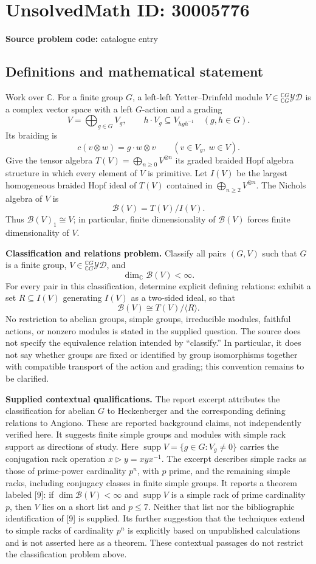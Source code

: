 \documentclass[11pt]{article}
\newcommand{\C}{\mathbb{C}}
\begin{document}
\section*{UnsolvedMath ID: 30005776}
\textbf{Source problem code:} catalogue entry
\subsection{Definitions and mathematical statement}
Work over \(\C\). For a finite group \(G\), a left-left Yetter--Drinfeld module \(V\in{}_{\C G}^{\C G}\mathcal{YD}\) is a complex vector space with a left \(G\)-action and a grading
\[
V=\bigoplus_{g\in G}V_g,
\qquad h\cdot V_g\subseteq V_{hgh^{-1}}\quad(g,h\in G).
\]
Its braiding is
\[
c(v\otimes w)=g\cdot w\otimes v
\qquad(v\in V_g,\ w\in V).
\]
Give the tensor algebra \(T(V)=\bigoplus_{n\geq0}V^{\otimes n}\) its graded braided Hopf algebra structure in which every element of \(V\) is primitive. Let \(I(V)\) be the largest homogeneous braided Hopf ideal of \(T(V)\) contained in \(\bigoplus_{n\geq2}V^{\otimes n}\). The Nichols algebra of \(V\) is
\[
\mathcal B(V)=T(V)/I(V).
\]
Thus \(\mathcal B(V)_1\cong V\); in particular, finite dimensionality of \(\mathcal B(V)\) forces finite dimensionality of \(V\).

\textbf{Classification and relations problem.} Classify all pairs \((G,V)\) such that \(G\) is a finite group, \(V\in{}_{\C G}^{\C G}\mathcal{YD}\), and
\[
\dim_{\C}\mathcal B(V)<\infty.
\]
For every pair in this classification, determine explicit defining relations: exhibit a set \(R\subseteq I(V)\) generating \(I(V)\) as a two-sided ideal, so that
\[
\mathcal B(V)\cong T(V)/\langle R\rangle.
\]
No restriction to abelian groups, simple groups, irreducible modules, faithful actions, or nonzero modules is stated in the supplied question. The source does not specify the equivalence relation intended by ``classify.'' In particular, it does not say whether groups are fixed or identified by group isomorphisms together with compatible transport of the action and grading; this convention remains to be clarified.

\textbf{Supplied contextual qualifications.} The report excerpt attributes the classification for abelian \(G\) to Heckenberger and the corresponding defining relations to Angiono. These are reported background claims, not independently verified here. It suggests finite simple groups and modules with simple rack support as directions of study. Here \(\operatorname{supp}V=\{g\in G:V_g\ne0\}\) carries the conjugation rack operation \(x\triangleright y=xyx^{-1}\). The excerpt describes simple racks as those of prime-power cardinality \(p^n\), with \(p\) prime, and the remaining simple racks, including conjugacy classes in finite simple groups. It reports a theorem labeled [9]: if \(\dim\mathcal B(V)<\infty\) and \(\operatorname{supp}V\) is a simple rack of prime cardinality \(p\), then \(V\) lies on a short list and \(p\leq7\). Neither that list nor the bibliographic identification of [9] is supplied. Its further suggestion that the techniques extend to simple racks of cardinality \(p^n\) is explicitly based on unpublished calculations and is not asserted here as a theorem. These contextual passages do not restrict the classification problem above.
\end{document}
